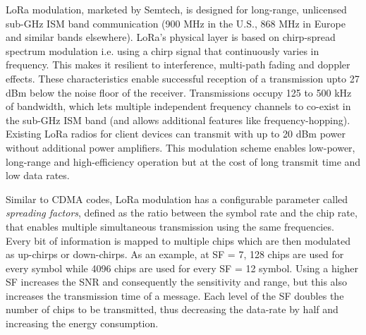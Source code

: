 LoRa modulation, marketed by Semtech, is designed for long-range, unlicensed sub-GHz
ISM band communication (900 MHz in the U.S., 868 MHz in Europe and similar bands elsewhere).
LoRa's physical layer is based on chirp-spread spectrum modulation i.e. 
using a chirp signal that continuously varies in frequency. This makes 
it resilient to interference, multi-path fading and doppler effects. These
characteristics enable successful reception of a transmission upto 27 dBm 
below the  noise floor of the receiver. Transmissions occupy 125 to 500 kHz of bandwidth, which lets multiple independent frequency channels to co-exist in the sub-GHz ISM band (and allows additional features like frequency-hopping). Existing LoRa radios for client devices can transmit with up to 20 dBm power without additional power amplifiers. This modulation scheme enables low-power, long-range and high-efficiency operation but at the cost of long transmit time and low data rates.

Similar to CDMA codes, LoRa modulation has a configurable parameter 
called \textit{spreading factors}, defined as the ratio between the 
symbol rate and the chip rate, that enables multiple simultaneous 
transmission using the same frequencies. Every bit of information is mapped to multiple chips
which are then modulated as up-chirps or down-chirps. As an example, at SF = 7, 128 chips are used for every symbol while 4096 chips are used for every SF = 12 symbol. Using a higher SF increases the SNR and consequently the sensitivity and range, but this also increases the transmission time of a message. Each level of the SF doubles the number of chips to be transmitted, thus decreasing the data-rate by half and increasing the energy consumption.



